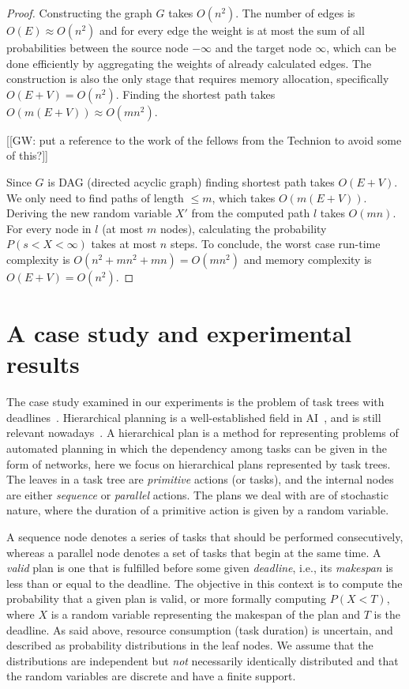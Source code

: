 \documentclass{article}
\begin{document}
\begin{proof}
	Constructing the graph $G$ takes $O(n^2)$. The number of edges is $O(E)\approx O(n^2)$ and for every edge the weight is at most the sum of all probabilities between the source node $-\infty$ and the target node $\infty$, which can be done efficiently by aggregating the weights of already calculated edges. 
	The construction is also the only stage that requires memory allocation, specifically $O(E+V)=O(n^2)$.
	Finding the shortest path takes $O(m(E+V))\approx O(mn^2)$. 
	
	[[GW: put a reference to the work of the fellows from the Technion to avoid some of this?]]
	
	Since $G$ is DAG (directed acyclic graph) finding shortest path takes $O(E+V)$. We only need to find paths of length $\leq m$, which takes $O(m(E+V))$.
	Deriving the new random variable $X'$ from the computed path $l$ takes $O(mn)$. For every node in $l$ (at most $m$ nodes), calculating the probability $P(s<X<\infty)$ takes at most $n$ steps. 
	To conclude, the worst case run-time complexity is $O(n^2+mn^2+mn)=O(mn^2)$ and memory complexity is $O(E+V)=O(n^2)$.
\end{proof}



\section{A case study and experimental results}\label{sec:exp}
The case study examined in our experiments is the problem of task trees with deadlines~\cite{cohen2015estimating,CohenGW18}. Hierarchical planning is a well-established field in AI~\cite{thomas1988hierarchical,erol1994htn,erol1996complexity}, and is still relevant nowadays~\cite{alford2016hierarchical,xiao2017hierarchical}. A hierarchical plan is a method for representing problems of automated planning in which the dependency among tasks can be given in the form of networks, here we focus on hierarchical plans represented by task trees. The leaves in a task tree are \emph{primitive} actions (or tasks), and the internal nodes are either \emph{sequence} or \emph{parallel} actions. The plans we deal with are of stochastic nature, where the duration of a primitive action is given by a random variable. 


A sequence node denotes a series of tasks that should be performed consecutively, whereas a parallel node denotes a set of tasks that begin at the same time. A \emph{valid} plan is one that is fulfilled before some given \emph{deadline}, i.e., its \emph{makespan} is less than or equal to the deadline. The objective in this context is to compute the probability that a given plan is valid, or more formally computing $P(X<T)$, where $X$ is a random variable representing the makespan of the plan and $T$ is the deadline. As said above, resource consumption (task duration) is uncertain, and described as probability distributions in the leaf nodes.
We assume that the distributions are independent but {\em not} necessarily identically distributed and that the random variables are discrete and have a finite support. 
\end{document}
